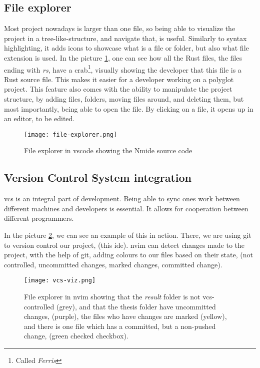 \subsection{File explorer}

Most project nowadays is larger than one file, so being able to visualize the
project in a tree-like-structure, and navigate that, is useful. Similarly to
syntax highlighting, it adds icons to showcase what is a file or folder, but
also what file extension is used. In the picture \ref{pic:fileEx}, one can see
how all the Rust files, the files ending with \textit{rs}, have a crab\footnote{Called \textit{Ferris}},
visually showing the developer that this file is a Rust source file. This makes
it easier for a developer working on a polyglot project. This feature also comes
with the ability to manipulate the project structure, by adding files, folders,
moving files around, and deleting them, but most importantly, being able to open
the file. By clicking on a file, it opens up in an editor, to be edited.

\begin{figure}
  \centering
  \texttt{[image: file-explorer.png]}
  \caption{File explorer in \gls*{vscode} showing the Nmide source code}
  \label{pic:fileEx}
\end{figure}

\subsection{Version Control System integration}

\gls*{vcs} is an integral part of development. Being able to sync ones work
between different machines and developers is essential. It allows for
cooperation between different programmers.

In the picture \ref{pic:vcsViz}, we can see an example of this in action. There,
we are using \gls*{git} to version control our project, (this \gls*{ide}).
\gls*{nvim} can detect changes made to the project, with the help of \gls*{git},
adding colours to our files based on their state, (not controlled, uncommitted
changes, marked changes, committed change).

\begin{figure}
  \centering
  \texttt{[image: vcs-viz.png]}
  \caption{
    File explorer in \gls*{nvim} showing that the \textit{result} folder is
    not \gls*{vcs}-controlled (grey), and that the thesis folder have uncommitted
    changes, (purple), the files who have changes are marked (yellow), and there
    is one file which has a committed, but a non-pushed change, (green checked
    checkbox).
  }
  \label{pic:vcsViz}
\end{figure}

